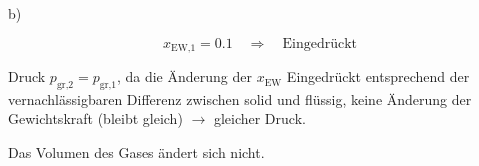 b) 

\[
x_{\text{EW,1}} = 0.1 \quad \Rightarrow \quad \text{Eingedrückt}
\]

Druck $p_{\text{gr,2}} = p_{\text{gr,1}}$, da die Änderung der $x_{\text{EW}}$ Eingedrückt entsprechend der vernachlässigbaren Differenz zwischen solid und flüssig, keine Änderung der Gewichtskraft (bleibt gleich) $\rightarrow$ gleicher Druck.

Das Volumen des Gases ändert sich nicht.